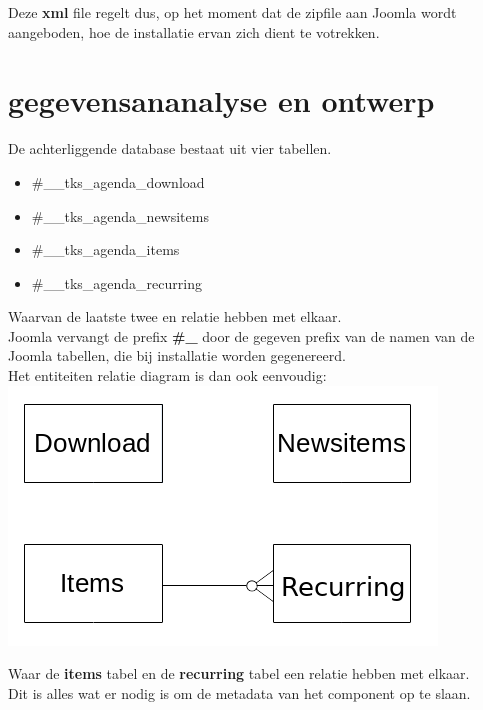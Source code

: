 \documentclass{article}
\begin{document}
Deze \textbf{xml} file regelt dus, op het moment dat de zipfile aan Joomla wordt aangeboden, hoe de installatie ervan zich dient te votrekken. \\

\newpage
\section{gegevensananalyse en ontwerp}

De achterliggende database bestaat uit vier tabellen. \\
\begin{itemize}
\item \#\_\_tks\_agenda\_download \\
\item \#\_\_tks\_agenda\_newsitems \\
\item \#\_\_tks\_agenda\_items \\
\item \#\_\_tks\_agenda\_recurring \\
\end{itemize}
Waarvan de laatste twee en relatie hebben met elkaar. \\

Joomla vervangt de prefix \textbf{\#\_\textunderscore} door de gegeven prefix van de 
namen van de Joomla tabellen, die bij installatie worden gegenereerd. \\

Het entiteiten relatie diagram is dan ook eenvoudig: \\

\includegraphics{erd}

Waar de \textbf{items} tabel en de \textbf{recurring} tabel een relatie hebben met elkaar. \\
Dit is alles wat er nodig is om de metadata van het component op te slaan. \\
\end{document}
